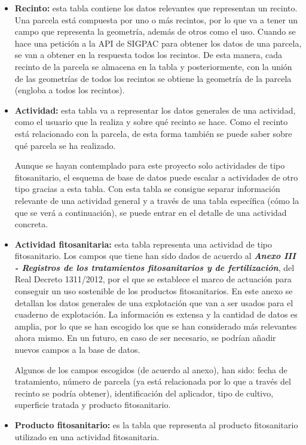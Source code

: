 \begin{itemize}
    \item \textbf{Recinto:} esta tabla contiene los datos relevantes que representan un recinto. Una parcela está compuesta por uno o más recintos, por lo que va a tener un campo que representa la geometría, además de otros
    como el uso. Cuando se hace una petición a la API de SIGPAC para obtener los datos de una parcela, se van a obtener en la respuesta todos los recintos. De esta manera, cada recinto de la parcela se almacena en la tabla 
    y posteriormente, con la unión de las geometrías de todos los recintos se obtiene la geometría de la parcela (engloba a todos los recintos).

    \item \textbf{Actividad:} esta tabla va a representar los datos generales de una actividad, como el usuario que la realiza y sobre qué recinto se hace. Como el recinto está relacionado con la parcela, de esta forma también
    se puede saber sobre qué parcela se ha realizado. 

    Aunque se hayan contemplado para este proyecto solo actividades de tipo fitosanitario, el esquema de base de datos puede escalar a actividades de otro tipo gracias a esta tabla. Con esta tabla se consigue separar información
    relevante de una actividad general y a través de una tabla específica (cómo la que se verá a continuación), se puede entrar en el detalle de una actividad concreta.

    \item \textbf{Actividad fitosanitaria:} esta tabla representa una actividad de tipo fitosanitario. Los campos que tiene han sido dados de acuerdo al \textbf{\textit{Anexo III - Registros de los tratamientos fitosanitarios y 
    de fertilización}}, del Real Decreto 1311/2012, por el que se establece el marco de actuación para conseguir un uso sostenible de los productos fitosanitarios. En este anexo se detallan los datos generales de una explotación 
    que van a ser usados para el cuaderno de explotación. La información es extensa y la cantidad de datos es amplia, por lo que se han escogido los que se han considerado más relevantes ahora mismo. En un futuro, en caso de ser 
    necesario, se podrían añadir nuevos campos a la base de datos.

    Algunos de los campos escogidos (de acuerdo al anexo), han sido: fecha de tratamiento, número de parcela (ya está relacionada por lo que a través del recinto se podría obtener), identificación del aplicador, tipo de cultivo,
    superficie tratada y producto fitosanitario.

    \item \textbf{Producto fitosanitario:} es la tabla que representa al producto fitosanitario utilizado en una actividad fitosanitaria.
\end{itemize}

